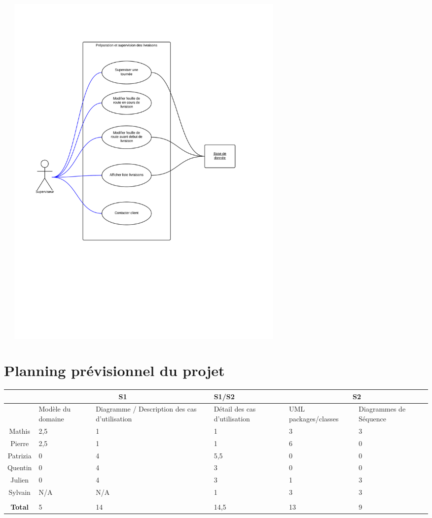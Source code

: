 \documentclass[a4paper]{report}
\begin{document}
\includegraphics[width=15cm, height=18cm]{images/DiagrammeCdU}

\section{Planning prévisionnel du projet}

\begin{center}
    \begin{tabular}{|c|p{2cm}|p{2cm}|p{2cm}|p{2.3cm}|p{2cm}|}
        \hline
        & \multicolumn{2}{|c|}{S1}  &  S1/S2  &  \multicolumn{2}{|c|}{S2} \\\hline
        & Modèle du domaine & Diagramme / Description des cas d'utilisation &
        Détail des cas d'utilisation & UML packages/classes & Diagrammes de
        Séquence\\\hline
        Mathis & 2,5 & 1 & 1 & 3 & 3\\\hline
        Pierre & 2,5 & 1 & 1 & 6 & 0\\\hline
        Patrizia & 0 & 4 & 5,5 & 0 & 0\\\hline
        Quentin & 0 & 4 & 3 & 0 & 0\\\hline
        Julien & 0 & 4 & 3 & 1 & 3\\\hline
        Sylvain & N/A & N/A & 1 & 3 & 3\\\hline
        \multicolumn{6}{|c|}{}\\\hline
        \textbf{Total} & 5 & 14 & 14,5 & 13 & 9\\\hline
    \end{tabular}
\end{center}
\end{document}

